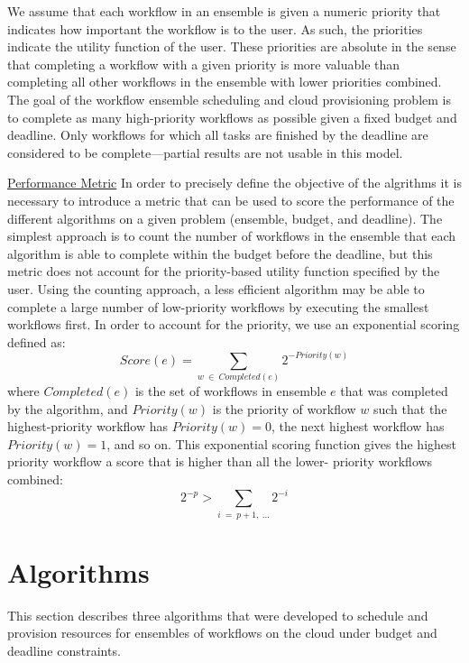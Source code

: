 \documentclass[conference]{IEEEtran}
\begin{document}
We assume that each workflow in an ensemble is given a numeric priority that
indicates how important the workflow is to the user. As such, the priorities
indicate the utility function of the user. These priorities are absolute in
the sense that completing a workflow with a given priority is more valuable
than completing all other workflows in the ensemble with lower priorities
combined. The goal of the workflow ensemble scheduling and cloud provisioning
problem is to complete as many high-priority workflows as possible given a
fixed budget and deadline. Only workflows for which all tasks are finished by
the deadline are considered to be complete---partial results are not usable in
this model.

\underline{Performance Metric}
\label{sec:perf_metric}
In order to precisely define the objective of the algrithms it is necessary to
introduce a metric that can be used to score the performance of the different
algorithms on a given problem (ensemble, budget, and deadline). The simplest
approach is to count the number of workflows in the ensemble that each algorithm
is able to complete within the budget before the deadline, but this metric does
not account for the priority-based utility function specified by the user. Using
the counting approach, a less efficient algorithm may be able to complete a
large number of low-priority workflows by executing the smallest workflows
first. In order to account for the priority, we use an exponential
scoring defined as:
$$ Score(e) = \sum_{w~\in~Completed(e)}{2^{-Priority(w)}} $$
where $Completed(e)$ is the set of workflows in ensemble $e$ that was completed
by the algorithm, and $Priority(w)$ is the priority of workflow $w$ such that
the highest-priority workflow has $Priority(w)=0$, the next highest workflow has
$Priority(w)=1$, and so on. This exponential scoring function gives the highest
priority workflow a score that is higher than all the lower- priority workflows
combined:
$$ 2^{-p} > \sum_{i~=~p+1,~\ldots}2^{-i} $$


\section{Algorithms}
\label{sec:algorithms}

This section describes three algorithms that were developed to schedule and
provision resources for ensembles of workflows on the cloud under budget and
deadline constraints.
\end{document}
